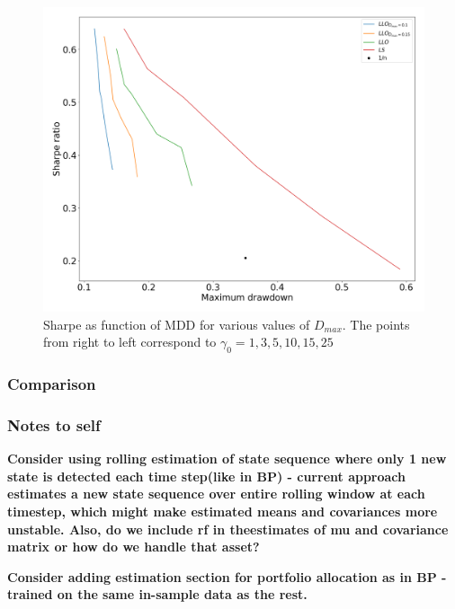 \begin{figure}[H]
    \centering
    \includegraphics[width=1\textwidth]{analysis/portfolio_exercise/images/mle/sharpe_mdd_llo.png}
    \caption[Sharpe as function of MDD for various values of $D_{max}$]{Sharpe as function of MDD for various values of $D_{max}$. The points from right to left correspond to $\gamma_0=1,3,5,10,15,25$}
    \label{fig:MPC_sharpe_mdd_llo}
\end{figure}

\subsubsection{Comparison}



\subsubsection{Notes to self}


\textbf{Consider using rolling estimation of state sequence where only 1 new state is detected each time step(like in BP) - current approach estimates a new state sequence over entire rolling window at each timestep, which might make estimated means and covariances more unstable. Also, do we include rf in theestimates of mu and covariance matrix or how do we handle that asset?}

\textbf{Consider adding estimation section for portfolio allocation as in BP - trained on the same in-sample data as the rest.}